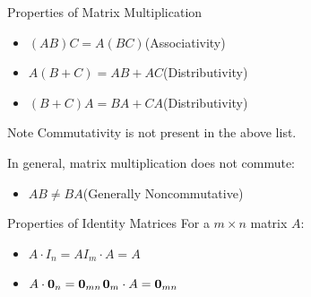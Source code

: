 \documentclass{beamer}
\begin{document}
\begin{frame}
\begin{block}{Properties of Matrix Multiplication}
\begin{itemize}
\item $(AB)C=A(BC)$\hfill (Associativity)
\item $A(B+C)=AB+AC$\hfill (Distributivity)
\item $(B+C)A=BA+CA$\hfill (Distributivity)
\end{itemize}
\end{block}\pause
\begin{block}{Note}
Commutativity is not present in the above list.

\vspace{2mm}
In general, matrix multiplication does not commute:
\begin{itemize}
\item $AB\neq BA$\hfill (Generally Noncommutative)
\end{itemize}
\end{block}\pause
\begin{block}{Properties of Identity Matrices}
For a $m\times n$ matrix $A$:
\begin{itemize}
\item $A\cdot I_n = A$\quad{}\quad$I_m\cdot A = A$
\item $A\cdot\boldsymbol{0}_{n} = \boldsymbol{0}_{mn}$\quad{}\quad$\boldsymbol{0}_{m}\cdot A=\boldsymbol{0}_{mn}$
\end{itemize}
\end{block}
\end{frame}
\end{document}
